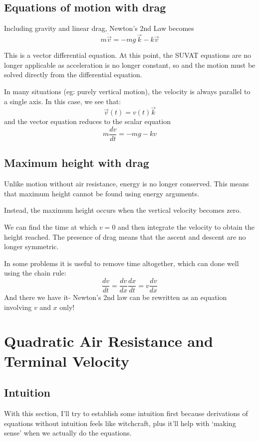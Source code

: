\subsection{Equations of motion with drag}

Including gravity and linear drag, Newton's 2nd Law becomes
$$
m\dot{\vec{v}} = -mg\,\vec{k} - k\vec{v}
$$

This is a vector differential equation. At this point, the SUVAT equations are no longer applicable as acceleration is no longer constant, so and the motion must be solved directly from the differential equation.

In many situations (eg: purely vertical motion), the velocity is always parallel to a single axis. In this case, we see that: 
$$
\vec{v}(t) = v(t)\vec{k}
$$
and the vector equation reduces to the scalar equation
$$
m\frac{dv}{dt} = -mg - kv
$$



\subsection{Maximum height with drag}

Unlike motion without air resistance, energy is no longer conserved. This means that maximum height cannot be found using energy arguments.

Instead, the maximum height occurs when the vertical velocity becomes zero. 

We can find the time at which $v=0$ and then integrate the velocity to obtain the height reached. The presence of drag means that the ascent and descent are no longer symmetric.

In some problems it is useful to remove time altogether, which can done well using the chain rule: 
$$
\frac{dv}{dt} = \frac{dv}{dx}\frac{dx}{dt} = v\frac{dv}{dx}
$$
And there we have it- Newton's 2nd law can be rewritten as an equation involving $v$ and $x$ only! 



\section{Quadratic Air Resistance and Terminal Velocity}

\subsection{Intuition}

With this section, I'll try to establish some intuition first because derivations of equations without intuition feels like witchcraft, plus it'll help with `making sense' when we actually do the equations. 

